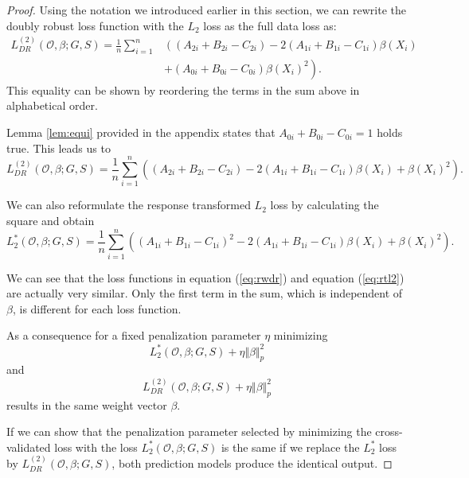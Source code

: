 \documentclass[12pt, a4paper]{scrartcl}
\theoremstyle{definition}
\theoremstyle{plain}
\numberwithin{equation}{section}
\numberwithin{figure}{section}
\numberwithin{table}{section}
\begin{document}
	\begin{proof}
		Using the notation we introduced earlier in this section, we can rewrite the doubly robust loss function with the $L_2$ loss as the full data loss as:
		\begin{equation}\label{eq:rwdr}
		\begin{split}
		L_{DR}^{(2)}(\mathcal{O}, \beta; G,S) = \frac{1}{n} \sum_{i=1}^n & \left((A_{2i}+B_{2i}-C_{2i}) - 2(A_{1i}+B_{1i}-C_{1i})\beta(X_i) \right.\\
		& \left.+ (A_{0i}+B_{0i}-C_{0i})\beta(X_i)^2\right).
		\end{split}
		\end{equation}
		This equality can be shown by reordering the terms in the sum above in alphabetical order.
		
		Lemma \ref{lem:equi} provided in the appendix states that $A_{0i}+B_{0i}-C_{0i} = 1$ holds true.
		This leads us to
		\begin{equation*}
		L_{DR}^{(2)}(\mathcal{O}, \beta; G,S) = \frac{1}{n} \sum_{i=1}^n  \left((A_{2i}+B_{2i}-C_{2i}) - 2(A_{1i}+B_{1i}-C_{1i})\beta(X_i) + \beta(X_i)^2\right).
		\end{equation*}
		
		We can also reformulate the response transformed $L_2$ loss by calculating the square and obtain
		\begin{equation}\label{eq:rtl2}
		L_2^*(\mathcal{O}, \beta; G,S) = \frac{1}{n} \sum_{i=1}^n \left((A_{1i}+B_{1i}-C_{1i})^2 - 2 (A_{1i}+B_{1i}-C_{1i}) \beta(X_i)+\beta(X_i)^2\right).
		\end{equation}
		
		We can see that the loss functions in equation (\ref{eq:rwdr}) and equation (\ref{eq:rtl2}) are actually very similar.
		Only the first term in the sum, which is independent of $\beta$, is different for each loss function.
	
		As a consequence for a fixed penalization parameter $\eta$ minimizing 
		\begin{equation*}
		L_2^*(\mathcal{O}, \beta; G,S) + \eta \Vert \beta \Vert_p^2
		\end{equation*}
		and 
		\begin{equation*}
		L_{DR}^{(2)}(\mathcal{O}, \beta; G,S) + \eta \Vert \beta \Vert_p^2
		\end{equation*}
		 results in the same weight vector $\beta$.
		 
		 If we can show that the penalization parameter selected by minimizing the cross-validated loss with the loss $L_2^*(\mathcal{O}, \beta; G,S)$ is the same if we replace the $L_2^*$ loss by $L_{DR}^{(2)}(\mathcal{O}, \beta; G,S)$, both prediction models produce the identical output.
		

\end{proof}
\end{document}
